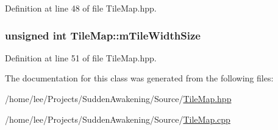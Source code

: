 Definition at line 48 of file Tile\-Map.\-hpp.

\hypertarget{class_tile_map_a98fe1a15d2a9fae5ecd3290fc9700661}{
\subsubsection[{m\-Tile\-Width\-Size}]{\setlength{\rightskip}{0pt plus 5cm}unsigned int Tile\-Map\-::m\-Tile\-Width\-Size\hspace{0.3cm}{\ttfamily [protected]}}}\label{class_tile_map_a98fe1a15d2a9fae5ecd3290fc9700661}


Definition at line 51 of file Tile\-Map.\-hpp.



The documentation for this class was generated from the following files\-:\begin{DoxyCompactItemize}
\item 
/home/lee/\-Projects/\-Sudden\-Awakening/\-Source/\hyperlink{_tile_map_8hpp}{Tile\-Map.\-hpp}\item 
/home/lee/\-Projects/\-Sudden\-Awakening/\-Source/\hyperlink{_tile_map_8cpp}{Tile\-Map.\-cpp}\end{DoxyCompactItemize}
